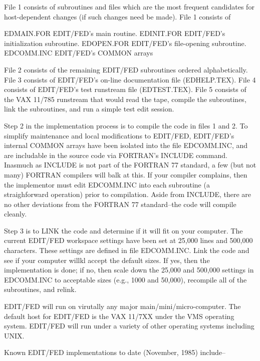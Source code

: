    File 1 consists of subroutines and files
   which are the most frequent candidates
   for host-dependent changes (if such changes
   need be made).  File 1 consists of
 
      EDMAIN.FOR    EDIT/FED's main routine.
      EDINIT.FOR    EDIT/FED's initialization subroutine.
      EDOPEN.FOR    EDIT/FED's file-opening subroutine.
      EDCOMM.INC    EDIT/FED's COMMON arrays
 
   File 2 consists of the remaining EDIT/FED
   subroutines ordered alphabetically.
   File 3 consists of EDIT/FED's on-line
   documentation file (EDHELP.TEX).
   File 4 consists of EDIT/FED's test
   runstream file (EDTEST.TEX).
   File 5 consists of the VAX 11/785
   runstream that would read the tape,
   compile the subroutines, link the
   subroutines, and run a simple test
   edit session.
 
   Step 2 in the implementation process is
   to compile the code in files 1 and 2.
   To simplify maintenance and local
   modifications to EDIT/FED, EDIT/FED's internal
   COMMON arrays have been isolated into
   the file EDCOMM.INC, and are includable
   in the source code via FORTRAN's
   INCLUDE command.  Inasmuch as INCLUDE
   is not part of the FORTRAN 77 standard,
   a few (but not many) FORTRAN compilers will
   balk at this.  If your compiler complains,
   then the implementor must edit EDCOMM.INC
   into each subroutine (a straighforward
   operation) prior to compilation.  Aside from
   INCLUDE, there are no other deviations from
   the FORTRAN 77 standard--the code will
   compile cleanly.
 
   Step 3 is to LINK the code and determine
   if it will fit on your computer.  The current
   EDIT/FED workspace settings have been set at
   25,000 lines and 500,000 characters.
   These settings are defined in file EDCOMM.INC.
   Link the code and see if your computer
   willkl accept the default sizes.  If
   yes, then the implementation is done;
   if no, then scale down the 25,000 and
   500,000 settings in EDCOMM.INC to
   acceptable sizes (e.g., 1000 and 50,000),
   recompile all of the subroutines, and
   relink.
 
   EDIT/FED will run on virutally any major
   main/mini/micro-computer.  The default
   host for EDIT/FED is the VAX 11/7XX under
   the VMS operating system.  EDIT/FED will
   run under a variety of other operating
   systems including UNIX.
 
   Known EDIT/FED implementations to date
   (November, 1985) include--
 

